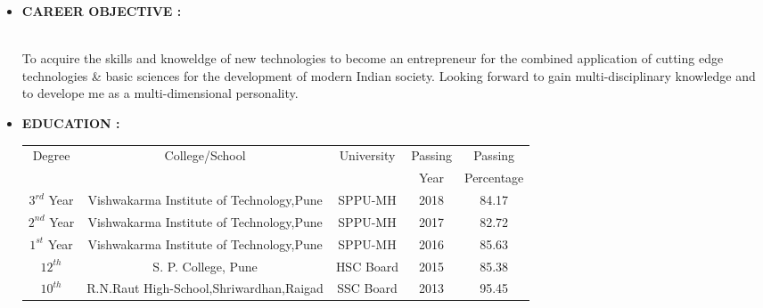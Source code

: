 \documentclass[11pt]{article}
\begin{document}
	\begin{itemize}[label=$\star$]  
		\item \begin{large} \textbf{CAREER OBJECTIVE :} \end{large}\\
		
		To acquire the skills and knoweldge of new technologies to become an entrepreneur for the combined application of  cutting edge technologies \& basic sciences for the development of modern Indian society. Looking forward to gain multi-disciplinary knowledge and to develope me as a multi-dimensional personality.
		\bigskip
		\item \begin{large} \textbf{EDUCATION :} \end{large}
		\begin{flushleft}
			\begin{tabular}{|c|c|c|c|c|}
				\hline
				\multirow{2}{*}{Degree} &\multirow{2}{*}{College/School}          &\multirow{2}{*}{University} &Passing  &Passing \\ 
				                        &                                         &			                   &Year	& Percentage\\ \hline	    			
				$3^{rd}$ Year           &Vishwakarma Institute of Technology,Pune &SPPU-MH                     &2018    &84.17 \\       \hline
				$2^{nd}$ Year           &Vishwakarma Institute of Technology,Pune &SPPU-MH                     &2017    &82.72 \\       \hline
				$1^{st}$ Year           &Vishwakarma Institute of Technology,Pune &SPPU-MH                     &2016    &85.63 \\       \hline
				$12^{th}$               &S. P. College, Pune                      &HSC Board                   &2015    &85.38 \\       \hline
				$10^{th}$               &R.N.Raut High-School,Shriwardhan,Raigad  &SSC Board                   &2013    &95.45 \\       \hline

\end{tabular}
\end{flushleft}
\end{itemize}
\end{document}
